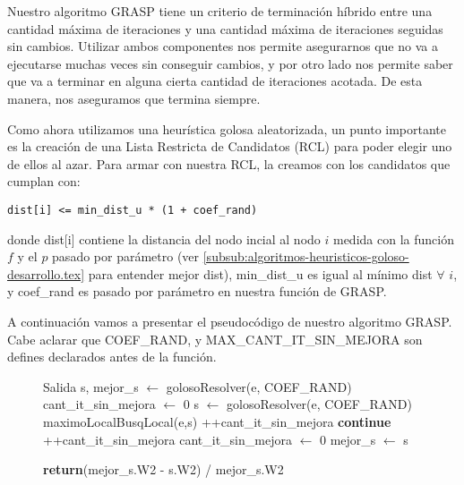 Nuestro algoritmo GRASP tiene un criterio de terminación híbrido entre una cantidad máxima de iteraciones y una cantidad máxima de iteraciones seguidas sin cambios. Utilizar ambos componentes nos permite asegurarnos que no va a ejecutarse muchas veces sin conseguir cambios, y por otro lado nos permite saber que va a terminar en alguna cierta cantidad de iteraciones acotada. De esta manera, nos aseguramos que termina siempre.

Como ahora utilizamos una heurística golosa aleatorizada, un punto importante es la creación de una Lista Restricta de Candidatos (RCL) para poder elegir uno de ellos al azar. Para armar con nuestra RCL, la creamos con los candidatos que cumplan con:

\begin{verbatim}
dist[i] <= min_dist_u * (1 + coef_rand)
\end{verbatim}

donde dist[i] contiene la distancia del nodo incial al nodo $i$ medida con la función $f$ y el $p$ pasado por parámetro (ver \ref{subsub:algoritmos-heuristicos-goloso-desarrollo.tex} para entender mejor dist), min\_dist\_u es igual al mínimo dist $\forall$ $i$, y coef\_rand es pasado por parámetro en nuestra función de GRASP.

A continuación vamos a presentar el pseudocódigo de nuestro algoritmo GRASP. Cabe aclarar que COEF\_RAND, y MAX\_CANT\_IT\_SIN\_MEJORA son defines declarados antes de la función.

\begin{center}
 \begin{figure}[H]
  \begin{pseudo}
    \State Salida s, mejor\_s $\leftarrow$ golosoResolver(e, COEF\_RAND)
    \State cant\_it\_sin\_mejora $\leftarrow$ 0   
      \State s $\leftarrow$ golosoResolver(e, COEF\_RAND)
      \State maximoLocalBusqLocal(e,s)
	\State++cant\_it\_sin\_mejora
	\State \textbf{continue}
      \EndIf
	\State ++cant\_it\_sin\_mejora
      \Else
	\State cant\_it\_sin\_mejora $\leftarrow$ 0
      \EndIf
	\State mejor\_s $\leftarrow$ s
      \EndIf
    \EndWhile
    \EndProcedure
  \end{pseudo}
 \end{figure}
\end{center}

\begin{center}
 \begin{figure}[H]
  \begin{pseudo}
    \State \textbf{return}(mejor\_s.W2 - s.W2) / mejor\_s.W2
  \EndProcedure
  \end{pseudo}
 \end{figure}
\end{center}